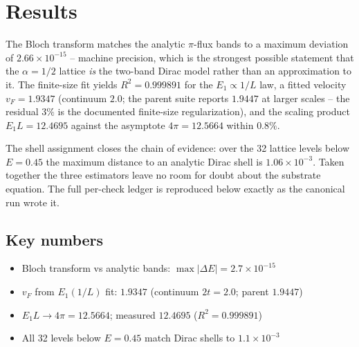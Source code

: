 \documentclass[11pt,a4paper]{article}
\begin{document}
\section{Results}
The Bloch transform matches the analytic $\pi$-flux bands to a maximum deviation of $2.66\times10^{-15}$ -- machine precision, which is the strongest possible statement that the $\alpha=1/2$ lattice \emph{is} the two-band Dirac model rather than an approximation to it. The finite-size fit yields $R^2 = 0.999891$ for the $E_1 \propto 1/L$ law, a fitted velocity $v_F = 1.9347$ (continuum $2.0$; the parent suite reports $1.9447$ at larger scales -- the residual $3\%$ is the documented finite-size regularization), and the scaling product $E_1 L = 12.4695$ against the asymptote $4\pi = 12.5664$ within $0.8\%$.

The shell assignment closes the chain of evidence: over the 32 lattice levels below $E = 0.45$ the maximum distance to an analytic Dirac shell is $1.06\times10^{-3}$. Taken together the three estimators leave no room for doubt about the substrate equation. The full per-check ledger is reproduced below exactly as the canonical run wrote it.

\subsection{Key numbers}
\begin{tcolorbox}[colback=labblue!6, colframe=labblue!70!black, boxrule=0.6pt, title={Key results (canonical run)}]
\begin{itemize}[leftmargin=1.2em, itemsep=0.15em]
\item Bloch transform vs analytic bands: $\max|\Delta E| = 2.7\times10^{-15}$
\item $v_F$ from $E_1(1/L)$ fit: $1.9347$ (continuum $2t=2.0$; parent $1.9447$)
\item $E_1 L \to 4\pi = 12.5664$; measured $12.4695$ ($R^2 = 0.999891$)
\item All 32 levels below $E=0.45$ match Dirac shells to $1.1\times10^{-3}$
\end{itemize}
\end{tcolorbox}
\end{document}
